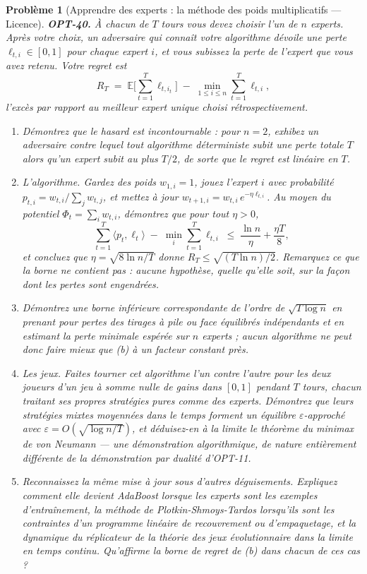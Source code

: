 \documentclass[11pt]{article}
\newtheorem{problem}{Problème}
\begin{document}
\begin{problem}[{Apprendre des experts : la méthode des poids multiplicatifs --- Licence}]
\textbf{OPT-40.} À chacun de $T$ tours vous devez choisir l'un de $n$ experts. Après votre choix, un adversaire qui connaît votre algorithme dévoile une perte $\ell_{t,i} \in [0,1]$ pour chaque expert $i$, et vous subissez la perte de l'expert que vous avez retenu. Votre \textit{regret} est
\[ R_T \;=\; \mathbb{E}\Big[\sum_{t=1}^{T} \ell_{t,i_t}\Big] \;-\; \min_{1 \le i \le n} \sum_{t=1}^{T} \ell_{t,i}, \]
l'excès par rapport au meilleur expert unique choisi rétrospectivement.
\begin{enumerate}
\item[(a)] Démontrez que le hasard est incontournable : pour $n = 2$, exhibez un adversaire contre lequel tout algorithme déterministe subit une perte totale $T$ alors qu'un expert subit au plus $T/2$, de sorte que le regret est linéaire en $T$.
\item[(b)] L'algorithme. Gardez des poids $w_{1,i} = 1$, jouez l'expert $i$ avec probabilité $p_{t,i} = w_{t,i}/\sum_j w_{t,j}$, et mettez à jour $w_{t+1,i} = w_{t,i}\,e^{-\eta \ell_{t,i}}$. Au moyen du potentiel $\Phi_t = \sum_i w_{t,i}$, démontrez que pour tout $\eta > 0$,
\[ \sum_{t=1}^{T} \langle p_t, \ell_t\rangle \;-\; \min_i \sum_{t=1}^{T}\ell_{t,i} \;\le\; \frac{\ln n}{\eta} + \frac{\eta T}{8}, \]
et concluez que $\eta = \sqrt{8\ln n / T}$ donne $R_T \le \sqrt{(T\ln n)/2}$. Remarquez ce que la borne ne contient \textit{pas} : aucune hypothèse, quelle qu'elle soit, sur la façon dont les pertes sont engendrées.
\item[(c)] Démontrez une borne inférieure correspondante de l'ordre de $\sqrt{T \log n}$ en prenant pour pertes des tirages à pile ou face équilibrés indépendants et en estimant la perte minimale espérée sur $n$ experts ; aucun algorithme ne peut donc faire mieux que (b) à un facteur constant près.
\item[(d)] Les jeux. Faites tourner cet algorithme l'un contre l'autre pour les deux joueurs d'un jeu à somme nulle de gains dans $[0,1]$ pendant $T$ tours, chacun traitant ses propres stratégies pures comme des experts. Démontrez que leurs stratégies mixtes moyennées dans le temps forment un équilibre $\varepsilon$-approché avec $\varepsilon = O(\sqrt{\log n / T})$, et déduisez-en à la limite le théorème du minimax de von Neumann --- une démonstration algorithmique, de nature entièrement différente de la démonstration par dualité d'OPT-11.
\item[(e)] Reconnaissez la même mise à jour sous d'autres déguisements. Expliquez comment elle devient AdaBoost lorsque les experts sont les exemples d'entraînement, la méthode de Plotkin-Shmoys-Tardos lorsqu'ils sont les contraintes d'un programme linéaire de recouvrement ou d'empaquetage, et la dynamique du réplicateur de la théorie des jeux évolutionnaire dans la limite en temps continu. Qu'affirme la borne de regret de (b) dans chacun de ces cas ?
\end{enumerate}

\end{problem}
\end{document}
